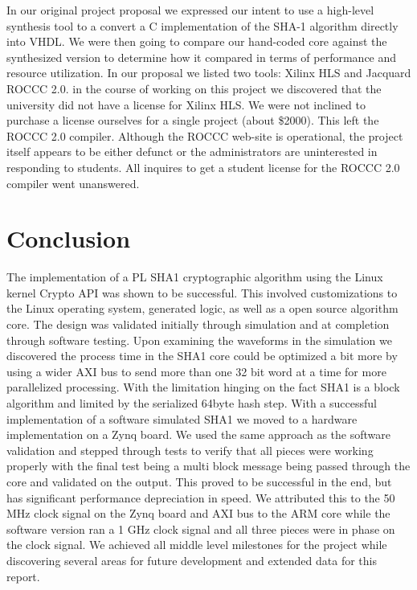 \documentclass[journal]{IEEEtran}
\begin{document}
In our original project proposal we expressed our intent to use a high-level synthesis tool to a convert a C implementation of the SHA-1 algorithm directly into VHDL.  We were then going to compare our hand-coded core against the synthesized version to determine how it compared in terms of performance and resource utilization.  In our proposal we listed two tools:  Xilinx HLS and Jacquard ROCCC 2.0.  in the course of working on this project we discovered that the university did not have a license for Xilinx HLS.  We were not inclined to purchase a license ourselves for a single project (about \$2000).  This left the ROCCC 2.0 compiler.  Although the ROCCC web-site is operational, the project itself appears to be either defunct or the administrators are uninterested in responding to students.  All inquires to get a student license for the ROCCC 2.0 compiler went unanswered.
\section{Conclusion}
The implementation of a PL SHA1 cryptographic algorithm using the Linux kernel Crypto API was shown to be successful.  This involved customizations to the Linux operating system, generated logic, as well as a open source algorithm core.  The design was validated initially through simulation and at completion through software testing.
Upon examining the waveforms in the simulation we discovered the process time in the SHA1 core could be optimized a bit more by using a wider AXI bus to send more than one 32 bit word at a time for more parallelized processing.  With the limitation hinging on the fact SHA1 is a block algorithm and limited by the serialized 64byte hash step.
With a successful implementation of a software simulated SHA1 we moved to a hardware implementation on a Zynq board.  We used the same approach as the software validation and stepped through tests to verify that all pieces were working properly with the final test being a multi block message being passed through the core and validated on the output.  This proved to be successful in the end, but has significant performance depreciation in speed.  We attributed this to the 50 MHz clock signal on the Zynq board and AXI bus to the ARM core while the software version ran a 1 GHz clock signal and all three pieces were in phase on the clock signal.  We achieved all middle level milestones for the project while discovering several areas for future development and extended data for this report.
\end{document}
